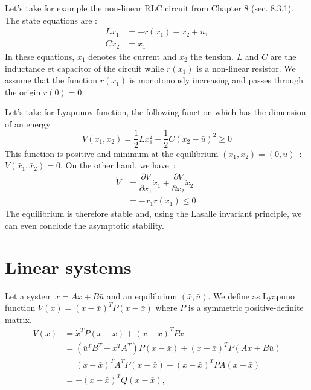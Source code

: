 
Let's take for example the non-linear RLC circuit from Chapter 8 (sec. 8.3.1). The state equations are :
\begin{equation*} \begin{split}
L \dot x_1 &= - r(x_1) - x_2 + \bar u, \\
C \dot x_2 &= x_1.
\end{split} \end{equation*}
In these equations, $x_1$ denotes the current and $x_2$ the tension. $L$ and $C$ are the inductance et capacitor of the circuit while $r(x_1)$ is a non-linear resistor. We assume that the function $r(x_1)$ is monotonously increasing and passes through the origin $r(0)=0$.

Let's take for Lyapunov function, the following function which has the dimension of an energy~:
 $$
 V(x_1, x_2) = \dfrac{1}{2}Lx_1^2+\dfrac{1}{2}C(x_2 -\bar u)^2 \geq 0
 $$
 This function is positive and minimum at the equilibrium $(\bar x_1, \bar x_2) =(0, \bar u)$~: $V(\bar x_1, \bar x_2) = 0$.
On the other hand, we have~:
\begin{equation*} \begin{split}
 \dot V &=  \dfrac{\partial V}{\partial x_1} \dot x_1 +
 \dfrac{\partial V}{\partial x_2} \dot x_2\\
 &= -x_1r(x_1) \leq 0.
\end{split} \end{equation*}
The equilibrium is therefore stable and, using the Lasalle invariant principle, we can even conclude the asymptotic stability.\\

\section{Linear systems}

\noindent Let a system $\dot x = Ax + B\bar u$ and an equilibrium $(\bar x, \bar u)$. We define as Lyapuno function $V(x) = (x-\bar x)^T P(x-\bar x)$ where
$P$ is a symmetric positive-definite matrix.
\begin{equation*} \begin{split}
\dot V(x) &= \dot x^TP(x-\bar x) +(x-\bar x)^TP\dot x \\
&= (\bar u^TB^T+x^TA^T)P(x-\bar x) +(x-\bar x)^TP(Ax +B\bar u)\\
&= (x-\bar x)^TA^TP(x-\bar x) +(x-\bar x)^TP A(x-\bar x) \\
&= -(x-\bar x)^TQ(x-\bar x),
\end{split} \end{equation*}

